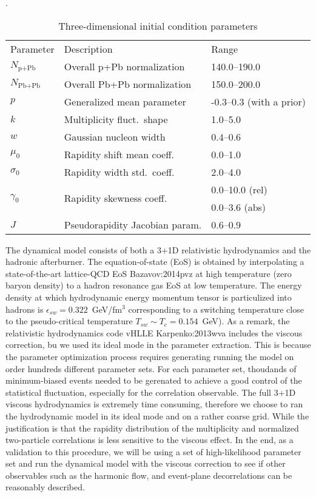 \begin{table}
\centering
\caption{Three-dimensional initial condition parameters}
\label{tab:trento:parameters}.
\begin{tabular}{lll}
      Parameter & Description	& Range \\
      \paddedhline
      $N_{\textrm{p+Pb}}$    & Overall p+Pb normalization      & 140.0--190.0 \\
      $N_{\textrm{Pb+Pb}}$   & Overall Pb+Pb normalization     & 150.0--200.0  \\
      $p$	                   & Generalized mean parameter      & -0.3--0.3 (with a prior)  \\
      $k$	                   & Multiplicity fluct.\ shape      & 1.0--5.0  \\
      $w$	                   & Gaussian nucleon width     & 0.4--0.6  \\
      $\mu_0$                & Rapidity shift mean coeff.\     & 0.0--1.0  \\
      $\sigma_0$             & Rapidity width std.\ coeff.\    & 2.0--4.0  \\
      \multirow{2}{*}{$\gamma_0$}             & \multirow{2}{*}{Rapidity skewness coeff.\ }      & 0.0--10.0 (rel) \\
                  &        & 0.0--3.6 (abs)  \\
      $J$	                   & Pseudorapidity Jacobian param.  & 0.6--0.9
\end{tabular}  
\end{table}

The dynamical model consists of both a 3+1D relativistic hydrodynamics and the hadronic afterburner.
The equation-of-state (EoS) is obtained by interpolating a state-of-the-art lattice-QCD EoS {Bazavov:2014pvz} at high temperature (zero baryon density) to a hadron resonance gas EoS at low temperature.
The energy density at which hydrodynamic energy momentum tensor is particulized into hadrons is $\epsilon_{sw} = 0.322$~GeV/fm$^3$ corresponding to a switching temperature close to the pseudo-critical temperature $T_{sw} \sim T_c = 0.154$~GeV).
As a remark, the relativistic hydrodynamics code \mbox{vHLLE} {Karpenko:2013wva} includes the viscous correction, bu we used its ideal mode in the parameter extraction.
This is because the parameter optimization process requires generating running the model on order hundreds different parameter sets.
For each parameter set, thoudands of minimum-biased events needed to be gerenated to achieve a good control of the statistical fluctuation, especially for the correlation observable. 
The full 3+1D viscous hydrodynamics is extremely time consuming, therefore we choose to ran the hydrodynamic model in its ideal mode and on a rather coarse grid.
While the justification is that the rapidity distribution of the multiplicity and normalized two-particle correlations is less sensitive to the viscous effect.
In the end, as a validation to this procedure, we will be using a set of high-likelihood parameter set and run the dynamical model with the viscous correction to see if other observables such as the harmonic flow, and event-plane decorrelations can be reasonably described.

